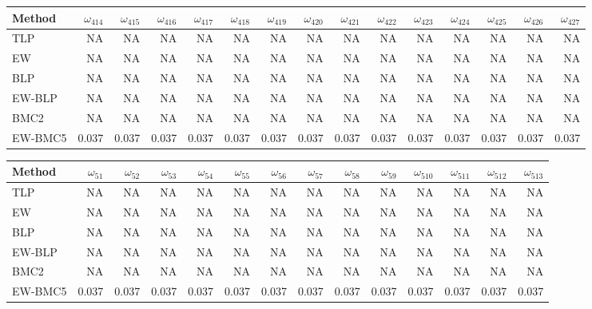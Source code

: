 \documentclass[
]{article}
\begin{document}
\begin{tabular}{lrrrrrrrrrrrrrr}
\toprule
Method & $\omega_{414}$ & $\omega_{415}$ & $\omega_{416}$ & $\omega_{417}$ & $\omega_{418}$ & $\omega_{419}$ & $\omega_{420}$ & $\omega_{421}$ & $\omega_{422}$ & $\omega_{423}$ & $\omega_{424}$ & $\omega_{425}$ & $\omega_{426}$ & $\omega_{427}$\\
\midrule
TLP & NA & NA & NA & NA & NA & NA & NA & NA & NA & NA & NA & NA & NA & NA\\
EW & NA & NA & NA & NA & NA & NA & NA & NA & NA & NA & NA & NA & NA & NA\\
BLP & NA & NA & NA & NA & NA & NA & NA & NA & NA & NA & NA & NA & NA & NA\\
EW-BLP & NA & NA & NA & NA & NA & NA & NA & NA & NA & NA & NA & NA & NA & NA\\
BMC2 & NA & NA & NA & NA & NA & NA & NA & NA & NA & NA & NA & NA & NA & NA\\
EW-BMC5 & 0.037 & 0.037 & 0.037 & 0.037 & 0.037 & 0.037 & 0.037 & 0.037 & 0.037 & 0.037 & 0.037 & 0.037 & 0.037 & 0.037\\
\bottomrule
\end{tabular}

\begin{tabular}{lrrrrrrrrrrrrr}
\toprule
Method & $\omega_{51}$ & $\omega_{52}$ & $\omega_{53}$ & $\omega_{54}$ & $\omega_{55}$ & $\omega_{56}$ & $\omega_{57}$ & $\omega_{58}$ & $\omega_{59}$ & $\omega_{510}$ & $\omega_{511}$ & $\omega_{512}$ & $\omega_{513}$\\
\midrule
TLP & NA & NA & NA & NA & NA & NA & NA & NA & NA & NA & NA & NA & NA\\
EW & NA & NA & NA & NA & NA & NA & NA & NA & NA & NA & NA & NA & NA\\
BLP & NA & NA & NA & NA & NA & NA & NA & NA & NA & NA & NA & NA & NA\\
EW-BLP & NA & NA & NA & NA & NA & NA & NA & NA & NA & NA & NA & NA & NA\\
BMC2 & NA & NA & NA & NA & NA & NA & NA & NA & NA & NA & NA & NA & NA\\
EW-BMC5 & 0.037 & 0.037 & 0.037 & 0.037 & 0.037 & 0.037 & 0.037 & 0.037 & 0.037 & 0.037 & 0.037 & 0.037 & 0.037\\
\bottomrule
\end{tabular}
\end{document}
